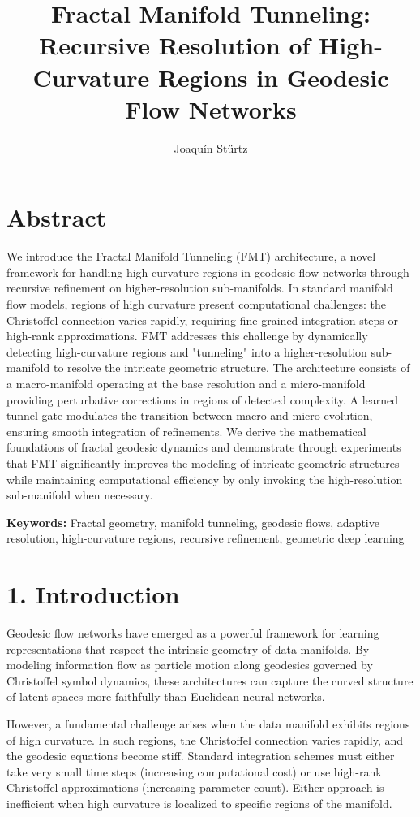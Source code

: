 \documentclass[12pt]{article}
\title{\textbf{Fractal Manifold Tunneling: Recursive Resolution of High-Curvature Regions in Geodesic Flow Networks}}
\author{Joaquín Stürtz}
\date{}
\begin{document}
\maketitle

\section*{Abstract}

We introduce the Fractal Manifold Tunneling (FMT) architecture, a novel framework for handling high-curvature regions in geodesic flow networks through recursive refinement on higher-resolution sub-manifolds. In standard manifold flow models, regions of high curvature present computational challenges: the Christoffel connection varies rapidly, requiring fine-grained integration steps or high-rank approximations. FMT addresses this challenge by dynamically detecting high-curvature regions and "tunneling" into a higher-resolution sub-manifold to resolve the intricate geometric structure. The architecture consists of a macro-manifold operating at the base resolution and a micro-manifold providing perturbative corrections in regions of detected complexity. A learned tunnel gate modulates the transition between macro and micro evolution, ensuring smooth integration of refinements. We derive the mathematical foundations of fractal geodesic dynamics and demonstrate through experiments that FMT significantly improves the modeling of intricate geometric structures while maintaining computational efficiency by only invoking the high-resolution sub-manifold when necessary.

\textbf{Keywords:} Fractal geometry, manifold tunneling, geodesic flows, adaptive resolution, high-curvature regions, recursive refinement, geometric deep learning

\section{1. Introduction}

Geodesic flow networks have emerged as a powerful framework for learning representations that respect the intrinsic geometry of data manifolds. By modeling information flow as particle motion along geodesics governed by Christoffel symbol dynamics, these architectures can capture the curved structure of latent spaces more faithfully than Euclidean neural networks.

However, a fundamental challenge arises when the data manifold exhibits regions of high curvature. In such regions, the Christoffel connection varies rapidly, and the geodesic equations become stiff. Standard integration schemes must either take very small time steps (increasing computational cost) or use high-rank Christoffel approximations (increasing parameter count). Either approach is inefficient when high curvature is localized to specific regions of the manifold.
\end{document}

